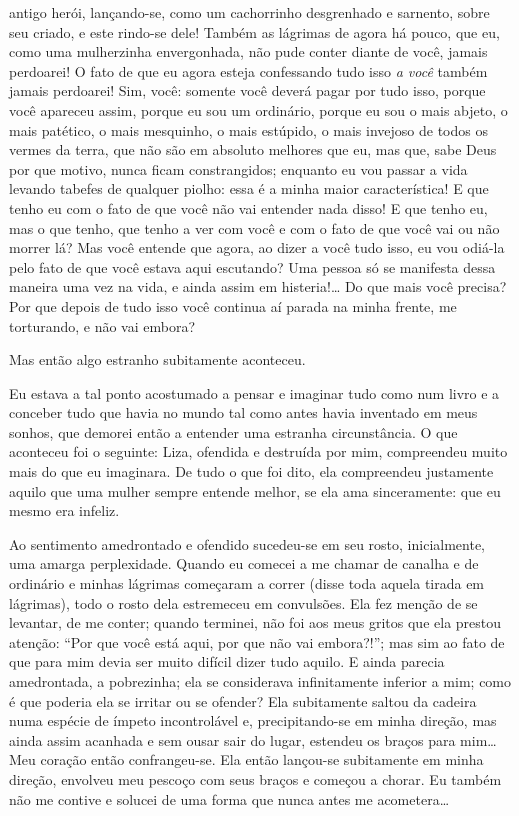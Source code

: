 antigo herói, lançando-se, como um cachorrinho desgrenhado e sarnento,
sobre seu criado, e este rindo-se dele! Também as lágrimas de agora há
pouco, que eu, como uma mulherzinha envergonhada, não pude conter
diante de você, jamais perdoarei! O fato de que eu agora esteja
confessando tudo isso \textit{a você} também jamais
perdoarei! Sim, você: somente você deverá pagar por tudo isso, porque
você apareceu assim, porque eu sou um ordinário, porque eu sou o mais
abjeto, o mais patético, o mais mesquinho, o mais estúpido, o mais
invejoso de todos os vermes da terra, que não são em absoluto melhores
que eu, mas que, sabe Deus por que motivo, nunca ficam constrangidos;
enquanto eu vou passar a vida levando tabefes de qualquer piolho: essa
é a minha maior característica! E que tenho eu com o fato de que você
não vai entender nada disso! E que tenho eu, mas o que tenho, que tenho
a ver com você e com o fato de que você vai ou não morrer lá? Mas você
entende que agora, ao dizer a você tudo isso, eu vou odiá-la pelo fato
de que você estava aqui escutando? Uma pessoa só se manifesta dessa
maneira uma vez na vida, e ainda assim em histeria!\ldots{} Do que mais você
precisa? Por que depois de tudo isso você continua aí parada na minha
frente, me torturando, e não vai embora?

Mas então algo estranho subitamente aconteceu.

Eu estava a tal ponto acostumado a pensar e imaginar tudo como num livro
e a conceber tudo que havia no mundo tal como antes havia inventado em
meus sonhos, que demorei então a entender uma estranha circunstância. O
que aconteceu foi o seguinte: Liza, ofendida e destruída por mim,
compreendeu muito mais do que eu imaginara. De tudo o que foi dito, ela
compreendeu justamente aquilo que uma mulher sempre entende melhor, se
ela ama sinceramente: que eu mesmo era \mbox{infeliz}.

Ao sentimento amedrontado e ofendido sucedeu-se em seu rosto,
inicialmente, uma amarga perplexidade. Quando eu comecei a me chamar de
canalha e de ordinário e minhas lágrimas começaram a correr (disse toda
aquela tirada em lágrimas), todo o rosto dela estremeceu em convulsões.
Ela fez menção de se levantar, de me conter; quando terminei, não foi
aos meus gritos que ela prestou atenção: “Por que você está aqui, por
que não vai embora?!”; mas sim ao fato de que para mim devia ser muito
difícil dizer tudo aquilo. E ainda parecia amedrontada, a pobrezinha;
ela se considerava infinitamente inferior a mim; como é que poderia ela
se irritar ou se ofender? Ela subitamente saltou da cadeira numa
espécie de ímpeto incontrolável e, precipitando-se em minha direção,
mas ainda assim acanhada e sem ousar sair do lugar, estendeu os braços
para mim\ldots{} Meu coração então confrangeu-se. Ela então lançou-se
subitamente em minha direção, envolveu meu pescoço com seus braços e
começou a chorar. Eu também não me contive e solucei de uma forma que
nunca antes me acometera\ldots{}

